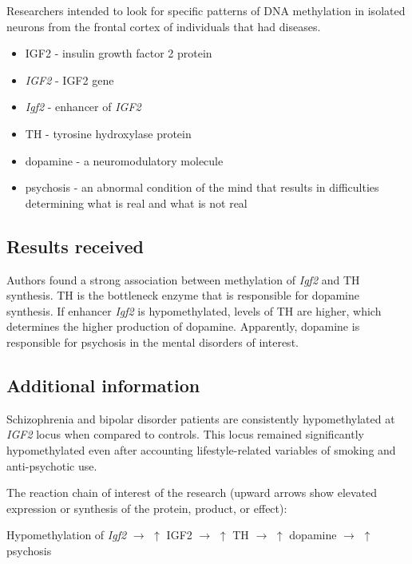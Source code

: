 \documentclass[
]{article}
\providecommand{\tightlist}{%
  \setlength{\itemsep}{0pt}\setlength{\parskip}{0pt}}
\begin{document}
Researchers intended to look for specific patterns of DNA methylation in
isolated neurons from the frontal cortex of individuals that had
diseases.

\begin{itemize}
\tightlist
\item
  IGF2 - insulin growth factor 2 protein
\item
  \emph{IGF2} - IGF2 gene
\item
  \emph{Igf2} - enhancer of \emph{IGF2}
\item
  TH - tyrosine hydroxylase protein
\item
  dopamine - a neuromodulatory molecule
\item
  psychosis - an abnormal condition of the mind that results in
  difficulties determining what is real and what is not real
\end{itemize}

\hypertarget{results-received}{%
\subsection{Results received}\label{results-received}}

Authors found a strong association between methylation of \emph{Igf2}
and TH synthesis. TH is the bottleneck enzyme that is responsible for
dopamine synthesis. If enhancer \emph{Igf2} is hypomethylated, levels of
TH are higher, which determines the higher production of dopamine.
Apparently, dopamine is responsible for psychosis in the mental
disorders of interest.

\hypertarget{additional-information}{%
\subsection{Additional information}\label{additional-information}}

Schizophrenia and bipolar disorder patients are consistently
hypomethylated at \emph{IGF2} locus when compared to controls. This
locus remained significantly hypomethylated even after accounting
lifestyle-related variables of smoking and anti-psychotic use.

The reaction chain of interest of the research (upward arrows show
elevated expression or synthesis of the protein, product, or effect):

Hypomethylation of \emph{Igf2} \(\rightarrow\) \(\uparrow\) IGF2
\(\rightarrow\) \(\uparrow\) TH \(\rightarrow\) \(\uparrow\) dopamine
\(\rightarrow\) \(\uparrow\) psychosis
\end{document}
